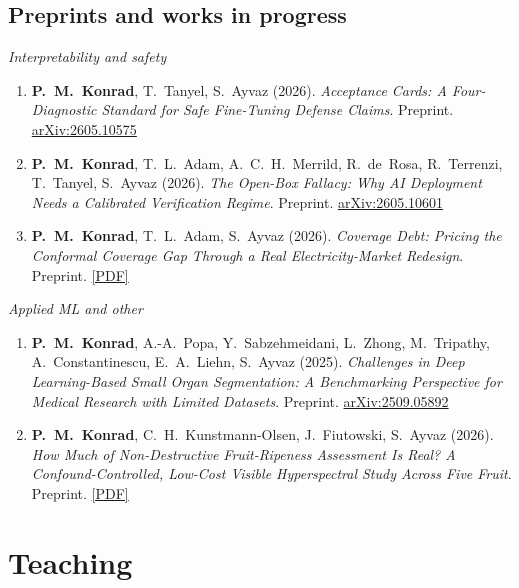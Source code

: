 \documentclass[11pt,a4paper,sans]{moderncv}
\begin{document}
\subsection{Preprints and works in progress}
\nopagebreak
{\itshape Interpretability and safety}
\begin{enumerate}[start=8]
\item \textbf{P.~M.~Konrad}, T.~Tanyel, S.~Ayvaz (2026). \emph{Acceptance Cards: A Four-Diagnostic Standard for Safe Fine-Tuning Defense Claims}. Preprint. \href{https://arxiv.org/abs/2605.10575}{arXiv:2605.10575}
\item \textbf{P.~M.~Konrad}, T.~L.~Adam, A.~C.~H.~Merrild, R.~de~Rosa, R.~Terrenzi, T.~Tanyel, S.~Ayvaz (2026). \emph{The Open-Box Fallacy: Why AI Deployment Needs a Calibrated Verification Regime}. Preprint. \href{https://arxiv.org/abs/2605.10601}{arXiv:2605.10601}
\item \textbf{P.~M.~Konrad}, T.~L.~Adam, S.~Ayvaz (2026). \emph{Coverage Debt: Pricing the Conformal Coverage Gap Through a Real Electricity-Market Redesign}. Preprint. \href{https://phomarkon.github.io/papers/Preprint_Coverage_Debt_Conformal_Market_Redesign.pdf}{[PDF]}
\end{enumerate}
{\itshape Applied ML and other}
\begin{enumerate}[start=11]
\item \textbf{P.~M.~Konrad}, A.-A.~Popa, Y.~Sabzehmeidani, L.~Zhong, M.~Tripathy, A.~Constantinescu, E.~A.~Liehn, S.~Ayvaz (2025). \emph{Challenges in Deep Learning-Based Small Organ Segmentation: A Benchmarking Perspective for Medical Research with Limited Datasets}. Preprint. \href{https://arxiv.org/abs/2509.05892}{arXiv:2509.05892}
\item \textbf{P.~M.~Konrad}, C.~H.~Kunstmann-Olsen, J.~Fiutowski, S.~Ayvaz (2026). \emph{How Much of Non-Destructive Fruit-Ripeness Assessment Is Real? A Confound-Controlled, Low-Cost Visible Hyperspectral Study Across Five Fruit}. Preprint. \href{https://phomarkon.github.io/papers/Preprint_Fruit_Ripeness_Confound_Controlled_Visible_HSI.pdf}{[PDF]}
\end{enumerate}

\section{Teaching}
\end{document}
